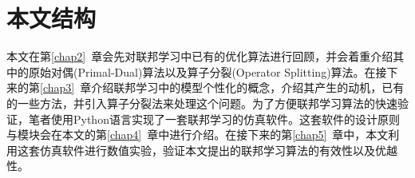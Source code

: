 \section{本文结构}
\label{sec:chap1-structure}


本文在第\ref{chap2}~章会先对联邦学习中已有的优化算法进行回顾，并会着重介绍其中的原始对偶(Primal-Dual)算法以及算子分裂(Operator Splitting)算法。在接下来的第\ref{chap3}~章介绍联邦学习中的模型个性化的概念，介绍其产生的动机，已有的一些方法，并引入算子分裂法来处理这个问题。为了方便联邦学习算法的快速验证，笔者使用Python语言实现了一套联邦学习的仿真软件。这套软件的设计原则与模块会在本文的第\ref{chap4}~章中进行介绍。在接下来的第\ref{chap5}~章中，本文利用这套仿真软件进行数值实验，验证本文提出的联邦学习算法的有效性以及优越性。
